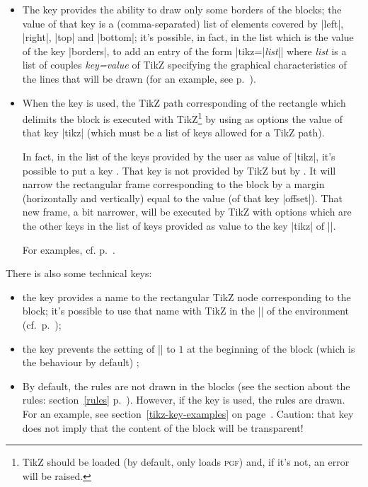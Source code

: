 \documentclass[dvipsnames]{article}%
\begin{document}
\begin{itemize}
\item {}
The key  provides the ability to draw only some
borders of the blocks; the value of that key is a (comma-separated) list of
elements covered by |left|, |right|, |top| and |bottom|; it's possible, in
fact, in the list which is the value of the key |borders|, to add an entry of
the form |tikz={|\textsl{list}|}| where \textsl{list} is a list of couples
\textsl{key=value} of TikZ specifying the graphical characteristics of the
lines that will be drawn (for an example, see p.~\pageref{dashed}).

\item {}
When the key  is used, the TikZ path corresponding of
the rectangle which delimits the block is executed with TikZ\footnote{TikZ
should be loaded (by default,  only loads \textsc{pgf}) and,
if it's not, an error will be raised.} by using as options the value of that
key |tikz| (which must be a list of keys allowed for a TikZ path). 

In fact, in the list of the keys provided by the user as value of |tikz|, it's
possible to put a key . That key is not provided by TikZ but
by . It will narrow the rectangular frame corresponding to the
block by a margin (horizontally and vertically) equal to the value (of that key
|offset|). That new frame, a bit narrower, will be executed by TikZ with options
which are the other keys in the list of keys provided as value to the key |tikz|
of |\Block|.

For examples, cf. p.~\pageref{tikz-key-examples}.
\end{itemize}


\medskip
There is also some technical keys:

\begin{itemize}
\item {}
the key  provides a name to the rectangular TikZ node
corresponding to the block; it's possible to use that name with TikZ in the
|\CodeAfter| of the environment (cf.~p.~\pageref{code-after});
\item {}
the key  prevents the setting of
|\arraystretch| to $1$ at the beginning of the block (which is the behaviour
by default) ;
\item {}
By default, the rules are not drawn in the blocks (see the section about
the rules: section~\ref{rules} p.~\pageref{rules}). However, if the key
 is used, the rules are drawn. For an example, see
section~\ref{tikz-key-examples} on page~\pageref{tikz-key-examples}. Caution:
that key does not imply that the content of the block will be transparent!
\end{itemize}
\end{document}
